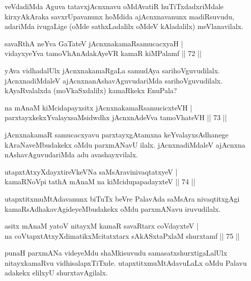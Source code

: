 \begin{artha}
veVdadiMda Aguva tatavxjAcnxnavu oMdAvatiR huTiTxdadxriMdale kirxyAkAraka savxrUpavanunx hoMdida ajAcnxnavanunx madiRsuvudu, adariMda ivugaLige (oMde sathxLadalilx oMdeV kAladalilx) meVlanavilalx.
\end{artha}

\begin{shl}
savaRthA neYva GaTateV jAcnxnakamaRsamucacxyaH |\\
vidayxyeYva tamoVhAnAdakAyeVR kamaR kiMPalamf \hfill || 72 ||
\end{shl}

\begin{artha}
yAva vidhadalUlx jAcnxnakamaRgaLa samudAya sarihoVguvudilalx. jAcnxnadiMdaleV ajAcnxnanAshavAguvudariMda sarihoVguvudilalx. kAyaRvalalxda (moVkaSxdalilx) kamaRkekx EnuPala?
\end{artha}

\begin{shl}
na mAnaM kiMcidapayxsitx jAcnxnakamaRsamucicxteVH |\\
parxtayxkekxYvalayxsaMsidwdhx jAcnxnAdeVva tamoVhateVH \hfill || 73 ||
\end{shl}

\begin{artha}
jAcnxnakamaR samucacxyavu parxtayxgAtamxna keYvalayxsAdhanege kAraNaveMbudakekx oMdu parxmANavU ilalx. jAcnxnadiMdaleV ajAcnxna nAshavAguvudariMda adu avashayxvilalx.
\end{artha}

\begin{shl}
utapxtAtxyXdayxtireVkeVNa saMsAravinivaqtatxyeV |\\
kamaRNoV\s pi tathA mAnaM na kiMcidupapadayxteV \hfill || 74 ||
\end{shl}

\begin{artha}
utapxtitxmuMtAdavanunx biTuTx beVre PalavAda saMsAra nivaqtitxgAgi kamaRsAdhakavAgideyeMbudakekx oMdu parxmANavu iruvudilalx.
\end{artha}


\begin{shl}
asitx mAnaM yatoV nitayxM kamaR savaRtarx coVdayxteV |\\
na coVtapxtAtxyXdimatikxMcitatxtarx sAkASxtaPxlaM shurxtamf \hfill || 75 ||
\end{shl}

\begin{artha}
punaH parxmANa videyeMdu shaMkisuvudu \mdash samasatxshurxtigaLalUlx nitayxkamaRvu vidhisalapxTiTxde. utapxtitxmuMtAdavuLaLx oMdu Palavu adakekx elilxyU shurxtavAgilalx.
\end{artha}

